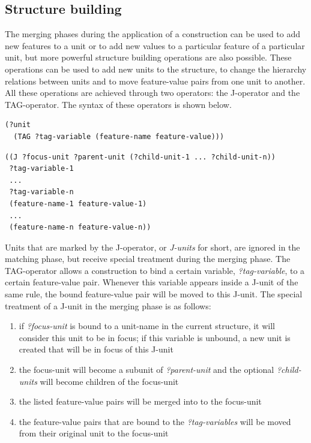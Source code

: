 \subsection{Structure building}

The merging phases during the application of a construction can be
used to add new features to a unit or to add new values to a
particular feature of a particular unit, but more powerful structure
building operations are also possible. These operations can be used to
add new units to the structure, to change the hierarchy relations
between units and to move feature-value pairs from one unit to
another. All these operations are achieved through two operators: the
J-operator \citep{debeule05hierarchy} and the TAG-operator. The syntax
of these operators is shown below.

\footnotesize
\begin{Verbatim}[frame=lines, label=Syntax of the TAG-operator]
(?unit
  (TAG ?tag-variable (feature-name feature-value)))
\end{Verbatim}
\newpage
\begin{Verbatim}[frame=lines, label=Syntax of the J-operator]
((J ?focus-unit ?parent-unit (?child-unit-1 ... ?child-unit-n))
 ?tag-variable-1 
 ...
 ?tag-variable-n
 (feature-name-1 feature-value-1)
 ...
 (feature-name-n feature-value-n))
\end{Verbatim}
\normalsize

Units that are marked by the J-operator, or \emph{J-units} for short,
are ignored in the matching phase, but receive special treatment
during the merging phase. The TAG-operator allows a construction to
bind a certain variable, \emph{?tag-variable}, to a certain
feature-value pair. Whenever this variable appears inside a J-unit of
the same rule, the bound feature-value pair will be moved to this
J-unit. The special treatment of a J-unit in the merging phase is as
follows:

\begin{enumerate}
\item if \emph{?focus-unit} is bound to a unit-name in the current
  structure, it will consider this unit to be in focus; if this
  variable is unbound, a new unit is created that will be in focus of
  this J-unit
\item the focus-unit will become a subunit of \emph{?parent-unit} and
  the optional \emph{?child-units} will become children of the
  focus-unit
\item the listed feature-value pairs will be merged into to the
  focus-unit
\item the feature-value pairs that are bound to the
  \emph{?tag-variables} will be moved from their original unit to the
  focus-unit
\end{enumerate}

